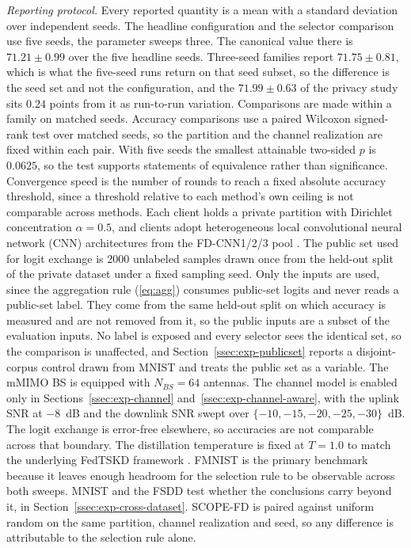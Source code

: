 \documentclass[journal]{IEEEtran}
\newcommand{\rev}[1]{#1}
\begin{document}
\rev{\textit{Reporting protocol.} Every reported quantity is a mean with a standard deviation over independent seeds. The headline configuration and the selector comparison use five seeds, the parameter sweeps three. \rev{The canonical value there is $71.21 \pm 0.99$ over the five headline seeds. Three-seed families report $71.75 \pm 0.81$, which is what the five-seed runs return on that seed subset, so the difference is the seed set and not the configuration, and the $71.99 \pm 0.63$ of the privacy study sits $0.24$ points from it as run-to-run variation. Comparisons are made within a family on matched seeds.} Accuracy comparisons use a paired Wilcoxon signed-rank test over matched seeds, so the partition and the channel realization are fixed within each pair. \rev{With five seeds the smallest attainable two-sided $p$ is $0.0625$, so the test supports statements of equivalence rather than significance.} Convergence speed is the number of rounds to reach a fixed absolute accuracy threshold, since a threshold relative to each method's own ceiling is not comparable across methods.} Each client holds a private partition with Dirichlet concentration $\alpha = 0.5$, and clients adopt heterogeneous local convolutional neural network (CNN) architectures from the FD-CNN1/2/3 pool \cite{chan2021fedhe}. \rev{The public set used for logit exchange \cite{itahara2023distillation} is $2000$ unlabeled samples drawn once from the held-out split of the private dataset under a fixed sampling seed. Only the inputs are used, since the aggregation rule (\ref{eq:agg}) consumes public-set logits and never reads a public-set label. \rev{They come from the same held-out split on which accuracy is measured and are not removed from it, so the public inputs are a subset of the evaluation inputs. No label is exposed and every selector sees the identical set, so the comparison is unaffected, and Section~\ref{ssec:exp-publicset} reports a disjoint-corpus control drawn from MNIST and treats the public set as a variable.}} The mMIMO BS is equipped with $N_{BS} = 64$ antennas. \rev{The channel model is enabled only in Sections~\ref{ssec:exp-channel} and~\ref{ssec:exp-channel-aware}, with the uplink SNR at $-8$~dB and the downlink SNR swept over $\{-10,-15,-20,-25,-30\}$~dB. The logit exchange is error-free elsewhere, so accuracies are not comparable across that boundary.} The distillation temperature is fixed at $T = 1.0$ to match the underlying FedTSKD framework \cite{mu2024fedtskd}.
FMNIST is the primary benchmark because it leaves enough headroom for the selection rule to be observable across both sweeps. \rev{MNIST and the FSDD test whether the conclusions carry beyond it, in Section~\ref{ssec:exp-cross-dataset}.}
SCOPE-FD is paired against uniform random on the same partition, channel realization and seed, so any difference is attributable to the selection rule alone. %
\end{document}
